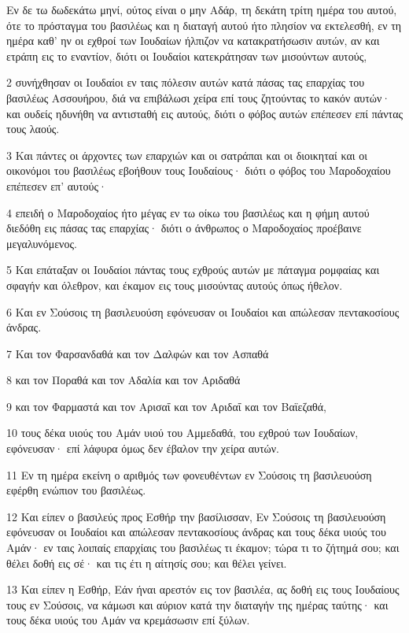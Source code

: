 \par Εν δε τω δωδεκάτω μηνί, ούτος είναι ο μην Αδάρ, τη δεκάτη τρίτη ημέρα του αυτού, ότε το πρόσταγμα του βασιλέως και η διαταγή αυτού ήτο πλησίον να εκτελεσθή, εν τη ημέρα καθ' ην οι εχθροί των Ιουδαίων ήλπιζον να κατακρατήσωσιν αυτών, αν και ετράπη εις το εναντίον, διότι οι Ιουδαίοι κατεκράτησαν των μισούντων αυτούς,
\par 2 συνήχθησαν οι Ιουδαίοι εν ταις πόλεσιν αυτών κατά πάσας τας επαρχίας του βασιλέως Ασσουήρου, διά να επιβάλωσι χείρα επί τους ζητούντας το κακόν αυτών· και ουδείς ηδυνήθη να αντισταθή εις αυτούς, διότι ο φόβος αυτών επέπεσεν επί πάντας τους λαούς.
\par 3 Και πάντες οι άρχοντες των επαρχιών και οι σατράπαι και οι διοικηταί και οι οικονόμοι του βασιλέως εβοήθουν τους Ιουδαίους· διότι ο φόβος του Μαροδοχαίου επέπεσεν επ' αυτούς·
\par 4 επειδή ο Μαροδοχαίος ήτο μέγας εν τω οίκω του βασιλέως και η φήμη αυτού διεδόθη εις πάσας τας επαρχίας· διότι ο άνθρωπος ο Μαροδοχαίος προέβαινε μεγαλυνόμενος.
\par 5 Και επάταξαν οι Ιουδαίοι πάντας τους εχθρούς αυτών με πάταγμα ρομφαίας και σφαγήν και όλεθρον, και έκαμον εις τους μισούντας αυτούς όπως ήθελον.
\par 6 Και εν Σούσοις τη βασιλευούση εφόνευσαν οι Ιουδαίοι και απώλεσαν πεντακοσίους άνδρας.
\par 7 Και τον Φαρσανδαθά και τον Δαλφών και τον Ασπαθά
\par 8 και τον Ποραθά και τον Αδαλία και τον Αριδαθά
\par 9 και τον Φαρμαστά και τον Αρισαΐ και τον Αριδαΐ και τον Βαϊεζαθά,
\par 10 τους δέκα υιούς του Αμάν υιού του Αμμεδαθά, του εχθρού των Ιουδαίων, εφόνευσαν· επί λάφυρα όμως δεν έβαλον την χείρα αυτών.
\par 11 Εν τη ημέρα εκείνη ο αριθμός των φονευθέντων εν Σούσοις τη βασιλευούση εφέρθη ενώπιον του βασιλέως.
\par 12 Και είπεν ο βασιλεύς προς Εσθήρ την βασίλισσαν, Εν Σούσοις τη βασιλευούση εφόνευσαν οι Ιουδαίοι και απώλεσαν πεντακοσίους άνδρας και τους δέκα υιούς του Αμάν· εν ταις λοιπαίς επαρχίαις του βασιλέως τι έκαμον; τώρα τι το ζήτημά σου; και θέλει δοθή εις σέ· και τις έτι η αίτησίς σου; και θέλει γείνει.
\par 13 Και είπεν η Εσθήρ, Εάν ήναι αρεστόν εις τον βασιλέα, ας δοθή εις τους Ιουδαίους τους εν Σούσοις, να κάμωσι και αύριον κατά την διαταγήν της ημέρας ταύτης· και τους δέκα υιούς του Αμάν να κρεμάσωσιν επί ξύλων.
